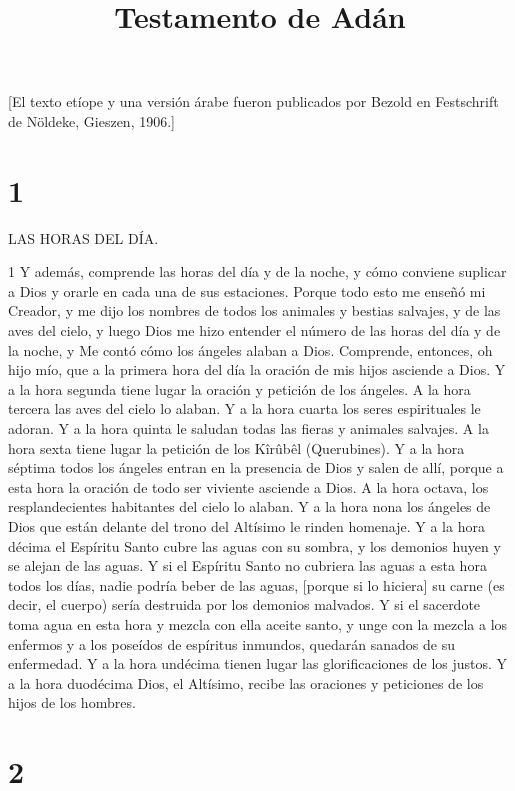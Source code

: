 

\title{Testamento de Adán}

[El texto etíope y una versión árabe fueron publicados por Bezold en Festschrift de Nöldeke, Gieszen, 1906.]

\chapter{1}

\par LAS HORAS DEL DÍA.

\par 1 Y además, comprende las horas del día y de la noche, y cómo conviene suplicar a Dios y orarle en cada una de sus estaciones. Porque todo esto me enseñó mi Creador, y me dijo los nombres de todos los animales y bestias salvajes, y de las aves del cielo, y luego Dios me hizo entender el número de las horas del día y de la noche, y Me contó cómo los ángeles alaban a Dios. Comprende, entonces, oh hijo mío, que a la primera hora del día la oración de mis hijos asciende a Dios. Y a la hora segunda tiene lugar la oración y petición de los ángeles. A la hora tercera las aves del cielo lo alaban. Y a la hora cuarta los seres espirituales le adoran. Y a la hora quinta le saludan todas las fieras y animales salvajes. A la hora sexta tiene lugar la petición de los Kîrûbêl (Querubines). Y a la hora séptima todos los ángeles entran en la presencia de Dios y salen de allí, porque a esta hora la oración de todo ser viviente asciende a Dios. A la hora octava, los resplandecientes habitantes del cielo lo alaban. Y a la hora nona los ángeles de Dios que están delante del trono del Altísimo le rinden homenaje. Y a la hora décima el Espíritu Santo cubre las aguas con su sombra, y los demonios huyen y se alejan de las aguas. Y si el Espíritu Santo no cubriera las aguas a esta hora todos los días, nadie podría beber de las aguas, [porque si lo hiciera] su carne (es decir, el cuerpo) sería destruida por los demonios malvados. Y si el sacerdote toma agua en esta hora y mezcla con ella aceite santo, y unge con la mezcla a los enfermos y a los poseídos de espíritus inmundos, quedarán sanados de su enfermedad. Y a la hora undécima tienen lugar las glorificaciones de los justos. Y a la hora duodécima Dios, el Altísimo, recibe las oraciones y peticiones de los hijos de los hombres.

\chapter{2}

